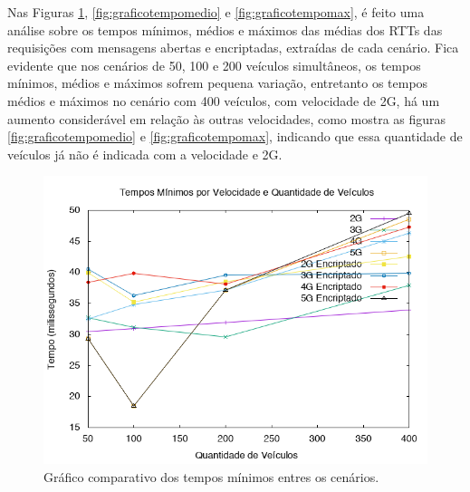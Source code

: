 \documentclass[
	12pt,				%
	oneside,			%
	a4paper,			%
	english,			%
	brazil				%
	]{abntex2ppgsi}
\begin{document}

Nas Figuras \ref{fig:graficotempomin},  \ref{fig:graficotempomedio} e  \ref{fig:graficotempomax}, é feito uma análise sobre os tempos mínimos, médios e máximos das médias dos RTTs das requisições com mensagens abertas e encriptadas, extraídas de cada cenário. Fica evidente que nos cenários de 50, 100 e 200 veículos simultâneos, os tempos mínimos, médios e máximos sofrem pequena variação, entretanto os tempos médios e máximos no cenário com 400 veículos, com velocidade de 2G, há um aumento considerável em relação às outras velocidades, como mostra as figuras \ref{fig:graficotempomedio} e  \ref{fig:graficotempomax}, indicando que essa quantidade de veículos já não é indicada com a velocidade e 2G.

\begin{figure}[h!]
	\centering
	\includegraphics[width=0.7\columnwidth]{images/grafico_tempo_min.png}
	\caption{Gráfico comparativo dos tempos mínimos entres os cenários.}
	\label{fig:graficotempomin}
\end{figure}
\end{document}
